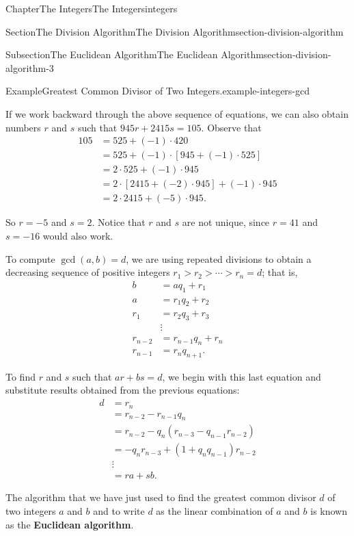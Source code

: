 \documentclass[oneside,10pt,]{book}
\newcommand{\terminology}[1]{\textbf{#1}}
\numberwithin{equation}{section}
\newcommand{\gt}{>}
\begin{document}
\begin{chapterptx}{Chapter}{The Integers}{}{The Integers}{}{}{integers}
\begin{sectionptx}{Section}{The Division Algorithm}{}{The Division Algorithm}{}{}{section-division-algorithm}
\begin{subsectionptx}{Subsection}{The Euclidean Algorithm}{}{The Euclidean Algorithm}{}{}{section-division-algorithm-3}
\begin{example}{Example}{Greatest Common Divisor of Two Integers.}{example-integers-gcd}
\par
If we work backward through the above sequence of equations, we can also obtain numbers \(r\) and \(s\) such that \(945 r + 2415 s = 105\).  Observe that%
\begin{align*}
105 & = 525 + (-1) \cdot 420\\
& = 525 + (-1) \cdot [945 + (-1) \cdot 525]\\
& = 2 \cdot 525 + (-1) \cdot 945\\
& = 2 \cdot [2415 + (-2) \cdot 945] + (-1) \cdot 945\\
& = 2 \cdot 2415 + (-5) \cdot 945\text{.}
\end{align*}
%
\par
So \(r = -5\) and \(s= 2\).  Notice that \(r\) and \(s\) are not unique, since \(r = 41\) and \(s = -16\) would also work.%
\end{example}
To compute \(\gcd(a,b) = d\), we are using repeated divisions to obtain a decreasing sequence of positive integers \(r_1 \gt r_2 \gt \cdots \gt r_n = d\); that is,%
\begin{align*}
b & = a q_1 + r_1\\
a & = r_1 q_2 + r_2\\
r_1 & = r_2 q_3 + r_3\\
& \vdots \\
r_{n - 2} & = r_{n - 1} q_{n} + r_{n}\\
r_{n - 1} & = r_n q_{n + 1}\text{.}
\end{align*}
%
\par
To find \(r\) and \(s\) such that \(ar + bs = d\), we begin with this last equation and substitute results obtained from the previous equations:%
\begin{align*}
d & = r_n\\
& = r_{n - 2} - r_{n - 1} q_n\\
& = r_{n - 2} - q_n( r_{n - 3} - q_{n - 1} r_{n - 2} )\\
& = -q_n r_{n - 3} + ( 1+ q_n q_{n-1} ) r_{n - 2}\\
& \vdots \\
& = ra + sb\text{.}
\end{align*}
%
\par
The algorithm that we have just used to find the greatest common divisor \(d\) of two integers \(a\) and \(b\) and to write \(d\) as the linear combination of \(a\) and \(b\) is known as the \terminology{Euclidean algorithm}.%
\end{subsectionptx}

\end{sectionptx}
\end{chapterptx}
\end{document}
